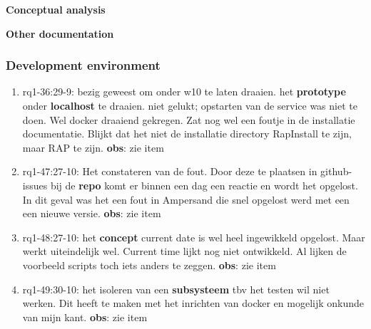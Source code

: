 \textbf{Conceptual analysis}
    

\textbf{Other documentation}

\subsubsection{Development environment}
\begin{comment}
plaats hier de afgehandelde items.
\end{comment}
\begin{enumerate}
    \item rq1-36:29-9: bezig geweest om onder w10 te laten draaien. het \textbf{prototype} onder \textbf{localhost} te draaien. niet gelukt; opstarten van de service was niet te doen. Wel docker draaiend gekregen. Zat nog wel een foutje in de installatie documentatie. Blijkt dat het niet de installatie directory RapInstall te zijn, maar RAP te zijn.
    \newline\textbf{obs}: zie item
    
    \item rq1-47:27-10: Het constateren van de fout. Door deze te plaatsen in github-issues bij de \textbf{repo} komt er binnen een dag een reactie en wordt het opgelost. In dit geval was het een fout in Ampersand die snel opgelost werd met een een nieuwe versie.
    \newline\textbf{obs}: zie item
        
    \item rq1-48:27-10: het \textbf{concept} current date is wel heel ingewikkeld opgelost. Maar werkt uiteindelijk wel. Current time lijkt nog niet ontwikkeld. Al lijken de voorbeeld scripts toch iets anders te zeggen.
    \newline\textbf{obs}: zie item
    
    \item rq1-49:30-10: het isoleren van een \textbf{subsysteem} tbv het testen wil niet werken. Dit heeft te maken met het inrichten van docker en mogelijk onkunde van mijn kant.
    \newline\textbf{obs}: zie item    
    
\end{enumerate}

